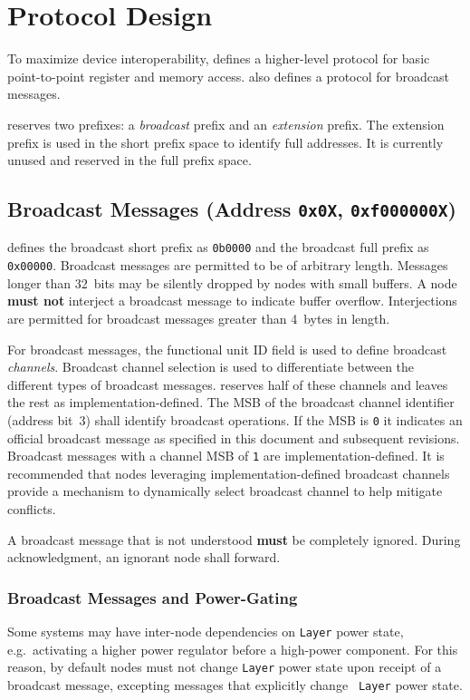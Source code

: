 \section{\bus Protocol Design}
\label{sec:protocol}

To maximize device interoperability, \bus defines a higher-level protocol for
basic point-to-point register and memory access. \bus also defines a protocol
for broadcast messages.

\bus reserves two prefixes: a {\em broadcast} prefix and an {\em extension}
prefix.  The extension prefix is used in the short prefix space to identify
full addresses. It is currently unused and reserved in the full prefix space.

\subsection{Broadcast Messages (Address \texttt{0x0X}, \texttt{0xf000000X})}
\label{sec:control-broadcast}
\bus defines the broadcast short prefix as {\tt 0b0000} and the broadcast full
prefix as {\tt 0x00000}. Broadcast messages
are permitted to be of arbitrary length. Messages longer than 32~bits may be
silently dropped by nodes with small buffers. A node \textbf{must not}
interject a broadcast message to indicate buffer overflow. Interjections
are permitted for broadcast messages greater than 4~bytes in length.

For broadcast messages, the functional unit ID field is used to define
broadcast {\em channels}. Broadcast channel selection is used to differentiate
between the different types of broadcast messages. \bus reserves half of these
channels and leaves the rest as implementation-defined.
%
The MSB of the broadcast channel identifier (address bit~3) shall identify
\bus broadcast operations. If the MSB is {\tt 0} it indicates an official \bus
broadcast message as specified in this document and subsequent revisions.
Broadcast messages with a channel MSB of {\tt 1} are implementation-defined.
It is recommended that nodes leveraging implementation-defined broadcast
channels provide a mechanism to dynamically select broadcast channel to help
mitigate conflicts.

A broadcast message that is not understood \textbf{must} be completely
ignored. During acknowledgment, an ignorant node shall forward.

\subsubsection{Broadcast Messages and Power-Gating}
Some systems may have inter-node dependencies on {\tt Layer} power state,
e.g.\ activating a higher power regulator before a high-power component. For
this reason, by default nodes must not change {\tt Layer} power state upon
receipt of a broadcast message, excepting messages that explicitly change {\tt
Layer} power state.

